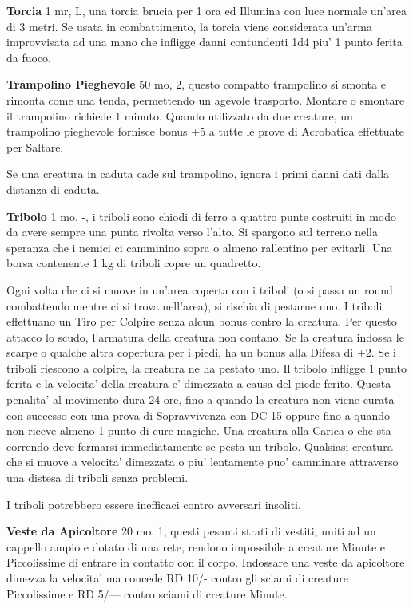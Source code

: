 \documentclass[a4paper,11pt,twoside,openany]{book}
\begin{document}
{\textbf{Torcia} 1 mr, L, una torcia brucia per 1 ora ed Illumina con luce normale un'area di 3 metri. Se usata in combattimento, la torcia viene considerata un'arma improvvisata ad una mano che infligge danni contundenti 1d4 piu' 1 punto ferita da fuoco. 

\textbf{Trampolino Pieghevole} 50 mo, 2, questo compatto trampolino si smonta e rimonta come una tenda, permettendo un agevole trasporto. Montare o smontare il trampolino richiede 1 minuto. Quando utilizzato da due creature, un trampolino pieghevole fornisce bonus +5 a tutte le prove di Acrobatica effettuate per Saltare.

Se una creatura in caduta cade sul trampolino, ignora i primi danni dati dalla distanza di caduta.

\textbf{Tribolo} 1 mo, -, i triboli sono chiodi di ferro a quattro punte costruiti in modo da avere sempre una punta rivolta verso l'alto. Si spargono sul terreno nella speranza che i nemici ci camminino sopra o almeno rallentino per evitarli. Una borsa contenente 1 kg di triboli copre un quadretto.

Ogni volta che ci si muove in un'area coperta con i triboli (o si passa un round combattendo mentre ci si trova nell'area), si rischia di pestarne uno. I triboli effettuano un Tiro per Colpire senza alcun bonus contro la creatura. Per questo attacco lo scudo, l'armatura della creatura non contano. Se la creatura indossa le scarpe o qualche altra copertura per i piedi, ha un bonus alla Difesa di +2. Se i triboli riescono a colpire, la creatura ne ha pestato uno. Il tribolo infligge 1 punto ferita e la velocita' della creatura e' dimezzata a causa del piede ferito. Questa penalita' al movimento dura 24 ore, fino a quando la creatura non viene curata con successo con una prova di Sopravvivenza con DC 15 oppure fino a quando non riceve almeno 1 punto di cure magiche.
Una creatura alla Carica o che sta correndo deve fermarsi immediatamente se pesta un tribolo. Qualsiasi creatura che si muove a velocita' dimezzata o piu' lentamente puo' camminare attraverso una distesa di triboli senza problemi.

I triboli potrebbero essere inefficaci contro avversari insoliti.

\textbf{Veste da Apicoltore} 20 mo, 1, questi pesanti strati di vestiti, uniti ad un cappello ampio e dotato di una rete, rendono impossibile a creature Minute e Piccolissime di entrare in contatto con il corpo. Indossare una veste da apicoltore dimezza la velocita' ma concede RD 10/- contro gli sciami di creature Piccolissime e RD 5/--- contro sciami di creature Minute.

}
\end{document}
